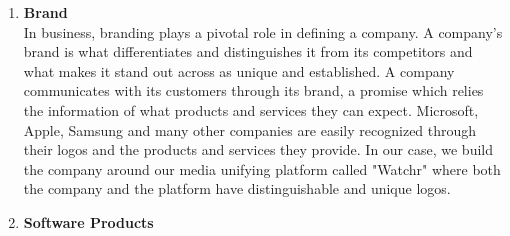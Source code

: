\begin{enumerate}
  \item \textbf{Brand}\\
In business, branding plays a pivotal role in defining a company. A company's brand is what differentiates and distinguishes it from its competitors and what makes it stand out across as unique and established. 
A company communicates with its customers through its brand, a promise which relies the information of what products and services they can expect. Microsoft, Apple, Samsung and many other companies are easily recognized through their logos and the products and services they provide. In our case, we build the company around our media unifying platform called "Watchr" where both the company and the platform have distinguishable and unique logos.
\pagebreak

  \item \textbf{Software Products}
  

\end{enumerate}
